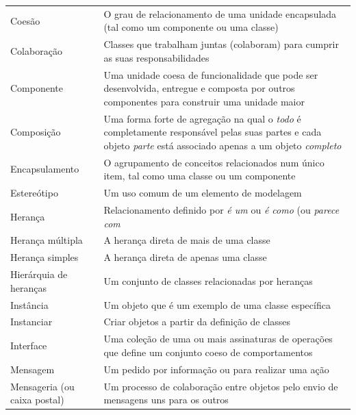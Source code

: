 \documentclass[
	11pt,				%
	openright,
	twoside,			%
	a4paper,			%
	english,			%
	french,
	brazil,				%
	sumario=tradicional
	]{abntex2}
\begin{document}
\begin{longtable}[l]{p{4.6cm}p{11.1cm}}
Coesão & O grau de relacionamento de uma unidade encapsulada (tal como um componente ou uma classe)\\

Colaboração & Classes que trabalham juntas (colaboram) para cumprir as suas responsabilidades\\

Componente & Uma unidade coesa de funcionalidade que pode ser desenvolvida, entregue e composta por outros componentes para construir uma unidade maior\\

Composição & Uma forma forte de agregação na qual o \emph{todo} é completamente responsável pelas suas partes e cada objeto \emph{parte} está associado apenas a um objeto \emph{completo}\\

Encapsulamento & O agrupamento de conceitos relacionados num único item, tal como uma classe ou um componente\\

Estereótipo & Um uso comum de um elemento de modelagem\\

Herança & Relacionamento definido por \emph{é um} ou \emph{é como} (ou \emph{parece com}\\

Herança múltipla & A herança direta de mais de uma classe\\

Herança simples & A herança direta de apenas uma classe\\

Hierárquia de heranças & Um conjunto de classes relacionadas por heranças\\

Instância & Um objeto que é um exemplo de uma classe específica\\

Instanciar & Criar objetos a partir da definição de classes\\

Interface & Uma coleção de uma ou mais assinaturas de operações que define um conjunto coeso de comportamentos\\

Mensagem & Um pedido por informação ou para realizar uma ação\\

Mensageria (ou caixa postal) & Um processo de colaboração entre objetos pelo envio de mensagens uns para os outros\\


\end{longtable}
\end{document}
